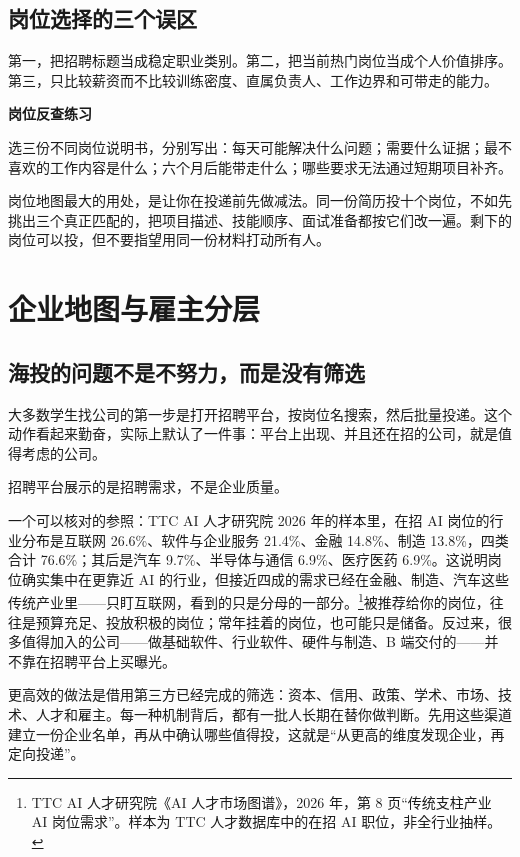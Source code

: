 \documentclass[UTF8,zihao=5,openany]{ctexbook}
\begin{document}
\section{岗位选择的三个误区}
第一，把招聘标题当成稳定职业类别。第二，把当前热门岗位当成个人价值排序。第三，只比较薪资而不比较训练密度、直属负责人、工作边界和可带走的能力。

\begin{toolbox}
\textbf{岗位反查练习}

选三份不同岗位说明书，分别写出：每天可能解决什么问题；需要什么证据；最不喜欢的工作内容是什么；六个月后能带走什么；哪些要求无法通过短期项目补齐。
\end{toolbox}

岗位地图最大的用处，是让你在投递前先做减法。同一份简历投十个岗位，不如先挑出三个真正匹配的，把项目描述、技能顺序、面试准备都按它们改一遍。剩下的岗位可以投，但不要指望用同一份材料打动所有人。

\chapter{企业地图与雇主分层}
\section{海投的问题不是不努力，而是没有筛选}
大多数学生找公司的第一步是打开招聘平台，按岗位名搜索，然后批量投递。这个动作看起来勤奋，实际上默认了一件事：平台上出现、并且还在招的公司，就是值得考虑的公司。

招聘平台展示的是招聘需求，不是企业质量。

一个可以核对的参照：TTC AI 人才研究院 2026 年的样本里，在招 AI 岗位的行业分布是互联网 26.6\%、软件与企业服务 21.4\%、金融 14.8\%、制造 13.8\%，四类合计 76.6\%；其后是汽车 9.7\%、半导体与通信 6.9\%、医疗医药 6.9\%。这说明岗位确实集中在更靠近 AI 的行业，但接近四成的需求已经在金融、制造、汽车这些传统产业里——只盯互联网，看到的只是分母的一部分。\footnote{TTC AI 人才研究院《AI 人才市场图谱》，2026 年，第 8 页“传统支柱产业 AI 岗位需求”。样本为 TTC 人才数据库中的在招 AI 职位，非全行业抽样。}被推荐给你的岗位，往往是预算充足、投放积极的岗位；常年挂着的岗位，也可能只是储备。反过来，很多值得加入的公司——做基础软件、行业软件、硬件与制造、B 端交付的——并不靠在招聘平台上买曝光。

更高效的做法是借用第三方已经完成的筛选：资本、信用、政策、学术、市场、技术、人才和雇主。每一种机制背后，都有一批人长期在替你做判断。先用这些渠道建立一份企业名单，再从中确认哪些值得投，这就是“从更高的维度发现企业，再定向投递”。
\end{document}

